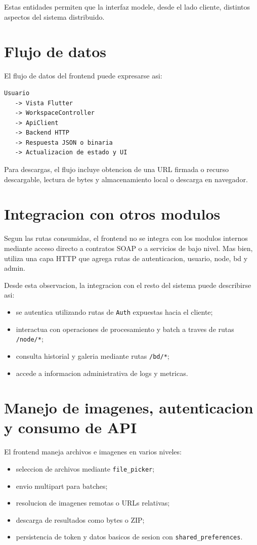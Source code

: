 \documentclass[conference]{IEEEtran}
\begin{document}
Estas entidades permiten que la interfaz modele, desde el lado cliente, distintos aspectos del sistema distribuido.

\section{Flujo de datos}
El flujo de datos del frontend puede expresarse asi:

\begin{lstlisting}
Usuario
   -> Vista Flutter
   -> WorkspaceController
   -> ApiClient
   -> Backend HTTP
   -> Respuesta JSON o binaria
   -> Actualizacion de estado y UI
\end{lstlisting}

Para descargas, el flujo incluye obtencion de una URL firmada o recurso descargable, lectura de bytes y almacenamiento local o descarga en navegador.

\section{Integracion con otros modulos}
Segun las rutas consumidas, el frontend no se integra con los modulos internos mediante acceso directo a contratos SOAP o a servicios de bajo nivel. Mas bien, utiliza una capa HTTP que agrega rutas de autenticacion, usuario, node, bd y admin.

Desde esta observacion, la integracion con el resto del sistema puede describirse asi:
\begin{itemize}[leftmargin=*]
\item se autentica utilizando rutas de \texttt{Auth} expuestas hacia el cliente;
\item interactua con operaciones de procesamiento y batch a traves de rutas \texttt{/node/*};
\item consulta historial y galeria mediante rutas \texttt{/bd/*};
\item accede a informacion administrativa de logs y metricas.
\end{itemize}

\section{Manejo de imagenes, autenticacion y consumo de API}
El frontend maneja archivos e imagenes en varios niveles:

\begin{itemize}[leftmargin=*]
\item seleccion de archivos mediante \texttt{file\_picker};
\item envio multipart para batches;
\item resolucion de imagenes remotas o URLs relativas;
\item descarga de resultados como bytes o ZIP;
\item persistencia de token y datos basicos de sesion con \texttt{shared\_preferences}.
\end{itemize}
\end{document}
